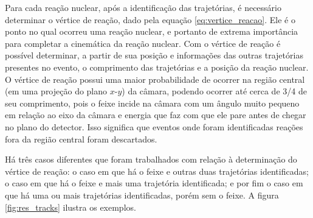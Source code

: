 \documentclass[a4paper,12pt,oneside]{book}
\begin{document}
\par Para cada reação nuclear, após a identificação das trajetórias, é necessário determinar o vértice de reação, dado pela equação \ref{eq:vertice_reacao}. Ele é o ponto no qual ocorreu uma reação nuclear, e portanto de extrema importância para completar a cinemática da reação nuclear. Com o vértice de reação é possível determinar, a partir de sua posição e informações das outras trajetórias presentes no evento, o comprimento das trajetórias e a posição da reação nuclear. O vértice de reação possui uma maior probabilidade de ocorrer na região central (em uma projeção do plano $x$-$y$) da câmara, podendo ocorrer até cerca de 3/4 de seu comprimento, pois o feixe incide na câmara com um ângulo muito pequeno em relação ao eixo da câmara e energia que faz com que ele pare antes de chegar no plano do detector. Isso significa que eventos onde foram identificadas reações fora da região central foram descartados.

\par Há três casos diferentes que foram trabalhados com relação à determinação do vértice de reação: o caso em que há o feixe e outras duas trajetórias identificadas; o caso em que há o feixe e mais uma trajetória identificada; e por fim o caso em que há uma ou mais trajetórias identificadas, porém sem o feixe. A figura \ref{fig:res_tracks} ilustra os exemplos.
\end{document}
